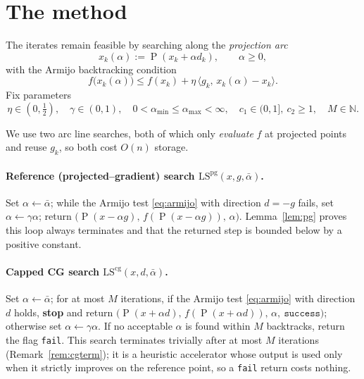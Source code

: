\documentclass[12pt]{article}
\DeclareMathOperator{\proj}{P}
\newcommand{\inner}[2]{\langle #1,\, #2\rangle}
\begin{document}
\section{The method}\label{sec:alg}

The iterates remain feasible by searching along the \emph{projection arc}
\begin{equation}\label{eq:arc}
x_k(\alpha):=\proj(x_k+\alpha d_k),\qquad\alpha\ge0,
\end{equation}
with the Armijo backtracking condition
\begin{equation}\label{eq:armijo}
f\big(x_k(\alpha)\big)\le f(x_k)+\eta\,\inner{g_k}{x_k(\alpha)-x_k}.
\end{equation}
Fix parameters
\begin{equation}\label{eq:params}
\eta\in(0,\tfrac12),\quad\gamma\in(0,1),\quad
0<\alpha_{\min}\le\alpha_{\max}<\infty,\quad c_1\in(0,1],\ c_2\ge1,\quad
M\in\mathbb{N}.
\end{equation}

We use two arc line searches, both of which only \emph{evaluate} $f$ at
projected points and reuse $g_k$, so both cost $O(n)$ storage.

\paragraph{Reference (projected--gradient) search
$\mathrm{LS}^{\mathrm{pg}}(x,g,\bar\alpha)$.}
Set $\alpha\leftarrow\bar\alpha$; while the Armijo test \eqref{eq:armijo} with
direction $d=-g$ fails, set $\alpha\leftarrow\gamma\alpha$; return
$\big(\proj(x-\alpha g),\,f(\proj(x-\alpha g)),\,\alpha\big)$.
Lemma~\ref{lem:pg} proves this loop always terminates and that the returned
step is bounded below by a positive constant.

\paragraph{Capped CG search $\mathrm{LS}^{\mathrm{cg}}(x,d,\bar\alpha)$.}
Set $\alpha\leftarrow\bar\alpha$; for at most $M$ iterations, if the Armijo test
\eqref{eq:armijo} with direction $d$ holds, \textbf{stop} and return
$\big(\proj(x+\alpha d),\,f(\proj(x+\alpha d)),\,\alpha,\ \texttt{success}\big)$;
otherwise set $\alpha\leftarrow\gamma\alpha$. If no acceptable $\alpha$ is found
within $M$ backtracks, return the flag \texttt{fail}.
This search terminates trivially after at most $M$ iterations
(Remark~\ref{rem:cgterm}); it is a heuristic accelerator whose output is used
only when it strictly improves on the reference point, so a \texttt{fail} return
costs nothing.
\end{document}
